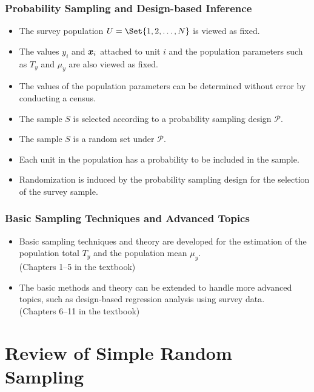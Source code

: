 \subsection*{Probability Sampling and Design-based Inference}
\begin{Regular}{}
      \begin{itemize}
            \item The survey population $ U=\Set{1,2,\ldots,N} $ is viewed as fixed.
            \item The values $ y_i $ and $ \bm{x}_i $ attached to unit $ i $
                  and the population parameters such as $ T_y $ and $ \mu_y $
                  are also viewed as fixed.
            \item The values of the population parameters can be determined without error by conducting
                  a census.
            \item The sample $ S $ is selected according to a probability sampling design $ \mathcal{P} $.
            \item The sample $ S $ is a random set under $ \mathcal{P} $.
            \item Each unit in the population has a probability to be included in the
                  sample.
            \item Randomization is induced by the probability sampling design for
                  the selection of the survey sample.
      \end{itemize}
\end{Regular}
\subsection*{Basic Sampling Techniques and Advanced Topics}
\begin{itemize}
      \item Basic sampling techniques and theory are developed for the
            estimation of the population total $T_y$ and the population mean $ \mu_y $.\\
            (Chapters 1--5 in the textbook)
      \item The basic methods and theory can be extended to handle more
            advanced topics, such as design-based regression analysis using
            survey data.\\
            (Chapters 6--11 in the textbook)
\end{itemize}
\chapter{Review of Simple Random Sampling}
